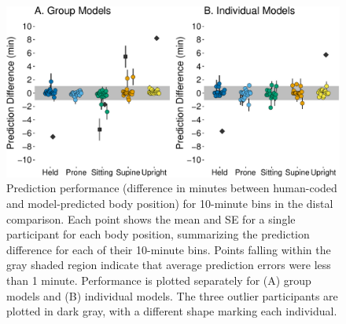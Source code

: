 \documentclass[
  man]{apa6}
\begin{document}
\begin{figure}

{\centering \includegraphics{manuscript_files/figure-latex/part2bins-1} 

}

\caption{Prediction performance (difference in minutes between human-coded and model-predicted body position) for 10-minute bins in the distal comparison. Each point shows the mean and SE for a single participant for each body position, summarizing the prediction difference for each of their 10-minute bins. Points falling within the gray shaded region indicate that average prediction errors were less than 1 minute. Performance is plotted separately for (A) group models and (B) individual models. The three outlier participants are plotted in dark gray, with a different shape marking each individual.}\label{fig:part2bins}
\end{figure}
\end{document}
